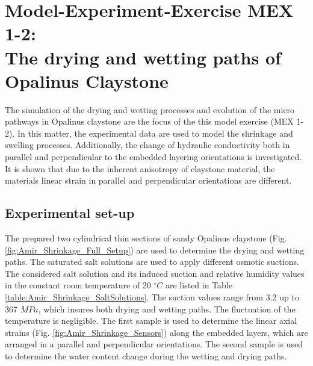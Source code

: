 \section[MEX 1-2: Drying and wetting in OPA]{Model-Experiment-Exercise MEX 1-2:\\The drying and wetting paths of Opalinus Claystone}
\label{sec:mex06}
The simulation of the drying and wetting processes and evolution of the micro pathways in Opalinus claystone are the focus of the this model exercise (MEX 1-2). In this matter, the experimental data are used to model the shrinkage and swelling processes. Additionally, the change of hydraulic conductivity both in parallel and perpendicular to the embedded layering orientations is investigated. It is shown that due to the inherent anisotropy of claystone material, the materials linear strain in parallel and perpendicular orientations are different.  
\subsection{Experimental set-up}
The prepared two cylindrical thin sections of sandy Opalinus claystone (Fig. \ref{fig:Amir_Shrinkage_Full_Setup}) are used to determine the drying and wetting paths. The saturated salt solutions are used to apply different osmotic suctions. The considered salt solution and its induced suction and relative humidity values in the constant room temperature of 20 $^{\circ}C$ are listed in Table \ref{table:Amir_Shrinkage_SaltSolutions}. The suction values range from 3.2 up to 367 $MPa$, which insures both drying and wetting paths. The fluctuation of the temperature is negligible. The first sample is used to determine the linear axial strains (Fig. \ref{fig:Amir_Shrinkage_Sensors}) along the embedded layers, which are arranged in a parallel and perpendicular orientations. The second sample is used to determine the water content change during the wetting and drying paths.

